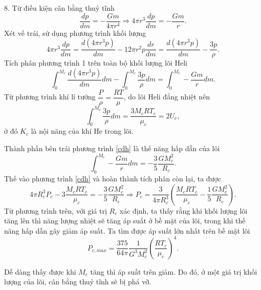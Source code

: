\begin{enumerate}
8. Từ điều kiện cân bằng thuỷ tĩnh
\begin{equation}
    \dfrac{dp}{dm}=-\dfrac{Gm}{4\pi r^4} \Rightarrow 4\pi r^3\dfrac{dp}{dm}=-\dfrac{Gm}{r}.
\end{equation}
Xét vế trái, sử dụng phương trình khối lượng
\begin{equation}
    4\pi r^3\dfrac{dp}{dm} =\dfrac{d(4\pi r^3 p)}{dm}-12\pi r^2 p\dfrac{dr}{dm} =\dfrac{d(4\pi r^3 p)}{dm}-\dfrac{3p}{\rho}.\label{eq_17_12}
\end{equation}
Tích phân phương trình 1 trên toàn bộ khối lượng lõi Heli
\begin{equation}
    \int_0^{M_c}\dfrac{d(4\pi r^3 p)}{dm}dm-\int_0^{M_c}\dfrac{3p}{\rho}dm=\int_0^{M_c}-\dfrac{Gm}{r}dm.
    \label{cdh}
\end{equation}
Từ phương trình khí lí tưởng $\dfrac{P}{\rho}=\dfrac{RT}{\mu}$, do lõi Heli đẳng nhiệt nên
\begin{equation}
    \int_0^{M_c}\dfrac{3p}{\rho}dm = \dfrac{3M_cRT_c}{\mu_c}=2U_c ,
\end{equation}
ở đó $K_c$ là nội năng của khí He trong lõi.

Thành phần bên trái phương trình \eqref{cdh} là thế năng hấp dẫn của lõi
\begin{equation}
    \int_0^{M_c}-\dfrac{Gm}{r}dm = -\frac35 \dfrac{GM^2_c}{R_c}.\label{eq_20_12}
\end{equation}
Thế vào phương trình \eqref{cdh} và hoàn thành tích phân còn lại, ta được
\begin{equation}
    4\pi R^3_cP_c-3 \dfrac{M_cRT_c}{\mu_c}=-\frac35 \dfrac{GM_c^2}{R_c} \Longrightarrow P_c=\dfrac{3}{4\pi R^3_c}\left(\dfrac{M_cRT_c}{\mu_c}-\frac15 \dfrac{GM^2_c}{R_c}\right).
\end{equation}
Từ phương trình trên, với giá trị $R_c$ xác định, ta thấy rằng khi khối lượng lõi tăng lên thì năng lượng nhiệt sẽ tăng áp suất ở bề mặt của lõi, trong khi thế năng hấp dẫn gây giảm áp suất. Ta tìm được áp suất lớn nhất trên bề mặt lõi
\begin{equation}
    P_{c,max} = \dfrac{375}{64\pi}\dfrac{1}{G^3M_c^2}\left(\dfrac{RT_c}{\mu_c}\right)^4 .\label{eq_22_12}
\end{equation}

Dễ dàng thấy được khi $M_c$ tăng thì áp suất trên giảm. Do đó, ở một giá trị khối lượng của lõi, cân bằng thuỷ tĩnh sẽ bị phá vỡ.


\end{enumerate}
